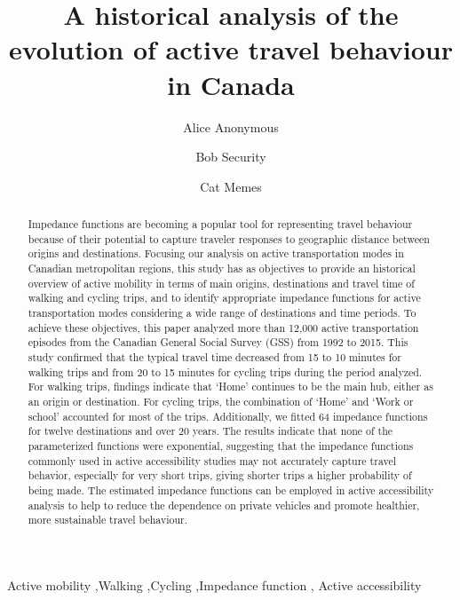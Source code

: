 \documentclass[preprint, 3p,
authoryear]{elsarticle} %
\begin{document}
\begin{frontmatter}

  \title{A historical analysis of the evolution of active travel
behaviour in Canada}
    \author[Some Institute of Technology]{Alice Anonymous%
  }
    \author[Some Institute of Technology]{Bob Security%
  }
    \author[Some Institute of Technology]{Cat Memes%
  }
  
  \begin{abstract}
  Impedance functions are becoming a popular tool for representing
  travel behaviour because of their potential to capture traveler
  responses to geographic distance between origins and destinations.
  Focusing our analysis on active transportation modes in Canadian
  metropolitan regions, this study has as objectives to provide an
  historical overview of active mobility in terms of main origins,
  destinations and travel time of walking and cycling trips, and to
  identify appropriate impedance functions for active transportation
  modes considering a wide range of destinations and time periods. To
  achieve these objectives, this paper analyzed more than 12,000 active
  transportation episodes from the Canadian General Social Survey (GSS)
  from 1992 to 2015. This study confirmed that the typical travel time
  decreased from 15 to 10 minutes for walking trips and from 20 to 15
  minutes for cycling trips during the period analyzed. For walking
  trips, findings indicate that `Home' continues to be the main hub,
  either as an origin or destination. For cycling trips, the combination
  of `Home' and `Work or school' accounted for most of the trips.
  Additionally, we fitted 64 impedance functions for twelve destinations
  and over 20 years. The results indicate that none of the parameterized
  functions were exponential, suggesting that the impedance functions
  commonly used in active accessibility studies may not accurately
  capture travel behavior, especially for very short trips, giving
  shorter trips a higher probability of being made. The estimated
  impedance functions can be employed in active accessibility analysis
  to help to reduce the dependence on private vehicles and promote
  healthier, more sustainable travel behaviour.
  \end{abstract}
    \begin{keyword}
    Active mobility \sep Walking \sep Cycling \sep Impedance
function \sep 
    Active accessibility
  \end{keyword}
  
 \end{frontmatter}
\end{document}
